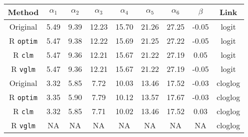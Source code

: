 
\begin{tabular}{ccccccccc}
\toprule
Method & $\alpha_1$ & $\alpha_2$ & $\alpha_3$ & $\alpha_4$ & $\alpha_5$ & $\alpha_6$ & $\beta$ & Link\\
\midrule
Original \citep{candy1991modeling} & 5.49 & 9.39 & 12.23 & 15.70 & 21.26 & 27.25 & -0.05 & logit\\
R \verb+optim+ & 5.47 & 9.38 & 12.22 & 15.69 & 21.25 & 27.22 & -0.05 & logit\\
R \verb+clm+ & 5.47 & 9.36 & 12.21 & 15.67 & 21.22 & 27.19 & 0.05 & logit\\
R \verb+vglm+ & 5.47 & 9.36 & 12.21 & 15.67 & 21.22 & 27.19 & -0.05 & logit\\
\addlinespace
Original \citep{candy1991modeling} & 3.32 & 5.85 & 7.72 & 10.03 & 13.46 & 17.52 & -0.03 & cloglog\\
R \verb+optim+ & 3.35 & 5.90 & 7.79 & 10.12 & 13.57 & 17.67 & -0.03 & cloglog\\
R \verb+clm+ & 3.32 & 5.85 & 7.71 & 10.02 & 13.46 & 17.52 & 0.03 & cloglog\\
R \verb+vglm+ & NA & NA & NA & NA & NA & NA & NA & cloglog\\
\bottomrule
\end{tabular}